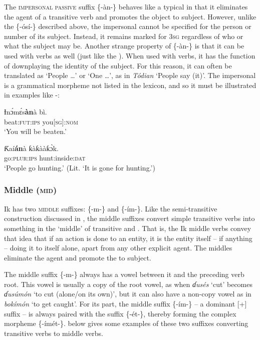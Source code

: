 The \textsc{impersonal passive} suffix \{-àn-\} behaves like a typical  in that it eliminates the agent of a transitive verb and promotes the object to subject. However, unlike the  \{-ósí-\} described above, the impersonal  cannot be specified for the person or number of its subject. Instead, it remains marked for 3\textsc{sg} regardless of who or what the subject may be. Another strange property of \{-\`{a}n-\} is that it can be used with  verbs as well (just like the ). When used with  verbs, it has the function of downplaying the identity of the subject. For this reason, it can often be translated as ‘People {\dots}’ or ‘One {\dots}’, as in \textit{Tódian} ‘People say (it)’. The impersonal  is a grammatical morpheme not listed in the lexicon, and so it must be illustrated in examples like -:




\ea\label{ex:verbs:3}
\gll Ɨn\'{ɔ}m\'{ɛ}s\textbf{àn}{à}   bì. \\
beat:\textsc{fut:ips}  you[\textsc{sg}]:\textsc{nom}    \\
\glt ‘You will be beaten.’ 
\z




\ea\label{ex:verbs:4}
\gll Ƙaí\textbf{án}{à}   ƙàƙààƙ\`{ɔ}k\ᵋ. \\
go:\textsc{plur:ips} hunt:inside:\textsc{dat}    \\
\glt ‘People go hunting.’ (Lit. ‘It is gone for hunting.’) 
\z




\subsubsection{Middle (\textsc{mid})}\label{sec:8.6.3}

Ik has two \textsc{middle} suffixes: \{-m-\} and \{-ím-\}. Like the semi-transitive construction discussed in , the middle suffixes convert simple transitive verbs into something in the ‘middle’ of transitive and . That is, the Ik middle verbs convey that idea that if an action is done to an entity, it is the entity itself – if anything – doing it to itself alone, apart from any other explicit agent. The middles eliminate the agent and promote the  to subject. 

The middle suffix \{-m-\} always has a vowel between it and the preceding verb root. This vowel is usually a copy of the root vowel, as when \textit{ɗusés} ‘cut’ becomes \textit{ɗusúmón} ‘to cut (alone/on its own)’, but it can also have a non-copy vowel as in \textit{bokímón} ‘to get caught’. For its part, the middle suffix \{-ím-\} – a dominant [+] suffix – is always paired with the  suffix \{-ét-\}, thereby forming the complex morpheme \{-ímét-\}.  below gives some examples of these two suffixes converting transitive verbs to middle verbs.


